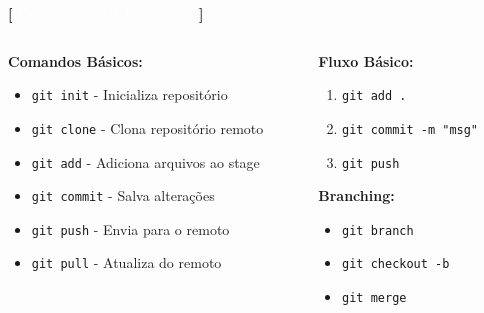 \documentclass[10pt, brazil]{beamer}
\begin{document}
\begin{frame}{\textcolor{lightpurple}{\textbf{[}} \textbf{\textcolor{white}{Comandos Git Essenciais}} \textcolor{lightpurple}{\textbf{]}}}
  
  \begin{columns}
    \begin{column}{0.5\textwidth}
      \textbf{Comandos Básicos:}
      \begin{itemize}
        \item \texttt{git init} - Inicializa repositório
        \item \texttt{git clone} - Clona repositório remoto
        \item \texttt{git add} - Adiciona arquivos ao stage
        \item \texttt{git commit} - Salva alterações
        \item \texttt{git push} - Envia para o remoto
        \item \texttt{git pull} - Atualiza do remoto
      \end{itemize}
    \end{column}
    \begin{column}{0.5\textwidth}
      \textbf{Fluxo Básico:}
      \begin{enumerate}
        \item \texttt{git add .}
        \item \texttt{git commit -m "msg"}
        \item \texttt{git push}
      \end{enumerate}
      
      \vspace{1em}
      \textbf{Branching:}
      \begin{itemize}
        \item \texttt{git branch}
        \item \texttt{git checkout -b}
        \item \texttt{git merge}
      \end{itemize}
    \end{column}
  \end{columns}

\end{frame}
\end{document}
